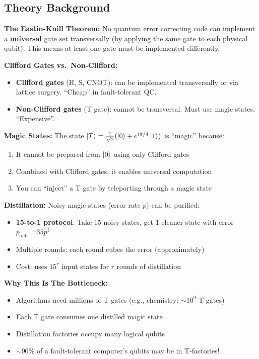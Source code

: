 \documentclass[11pt,a4paper]{article}
\begin{document}
\subsection*{Theory Background}
\textbf{The Eastin-Knill Theorem:} No quantum error correcting code can implement a \textbf{universal} gate set transversally (by applying the same gate to each physical qubit). This means at least one gate must be implemented differently.

\textbf{Clifford Gates vs.\ Non-Clifford:}
\begin{itemize}
    \item \textbf{Clifford gates} (H, S, CNOT): can be implemented transversally or via lattice surgery. ``Cheap'' in fault-tolerant QC.
    \item \textbf{Non-Clifford gates} (T gate): cannot be transversal. Must use magic states. ``Expensive''.
\end{itemize}

\textbf{Magic States:} The state $\ket{T} = \frac{1}{\sqrt{2}}(\ket{0} + e^{i\pi/4}\ket{1})$ is ``magic'' because:
\begin{enumerate}
    \item It cannot be prepared from $\ket{0}$ using only Clifford gates
    \item Combined with Clifford gates, it enables universal computation
    \item You can ``inject'' a T gate by teleporting through a magic state
\end{enumerate}

\textbf{Distillation:} Noisy magic states (error rate $p$) can be purified:
\begin{itemize}
    \item \textbf{15-to-1 protocol}: Take 15 noisy states, get 1 cleaner state with error $p_{\text{out}} = 35p^3$
    \item Multiple rounds: each round cubes the error (approximately)
    \item Cost: uses $15^r$ input states for $r$ rounds of distillation
\end{itemize}

\textbf{Why This Is The Bottleneck:}
\begin{itemize}
    \item Algorithms need millions of T gates (e.g., chemistry: $\sim 10^9$ T gates)
    \item Each T gate consumes one distilled magic state
    \item Distillation factories occupy many logical qubits
    \item $\sim$90\% of a fault-tolerant computer's qubits may be in T-factories!
\end{itemize}
\end{document}
